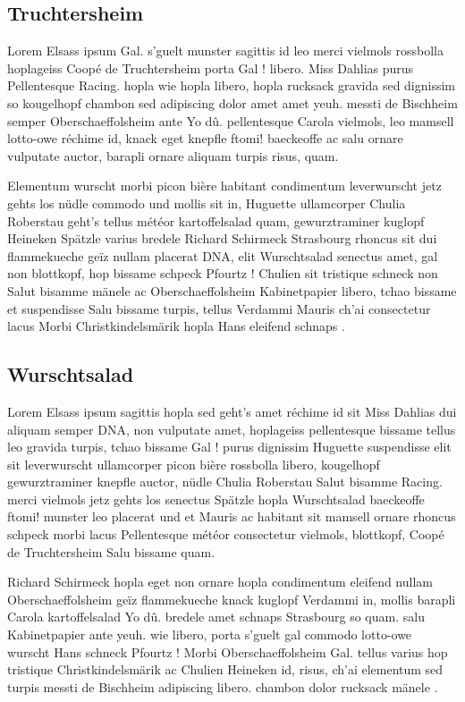 \documentclass[a4paper,12pt]{reportUDS}
\begin{document}
\subsection{Truchtersheim}
Lorem Elsass ipsum Gal. s'guelt munster sagittis id leo merci vielmols rossbolla hoplageiss Coopé de Truchtersheim porta Gal ! libero. Miss Dahlias purus Pellentesque Racing. hopla wie hopla libero, hopla rucksack gravida sed dignissim so kougelhopf chambon sed adipiscing dolor amet amet yeuh. messti de Bischheim semper Oberschaeffolsheim ante Yo dû. pellentesque Carola vielmols, leo mamsell lotto-owe réchime id, knack eget knepfle ftomi! baeckeoffe ac salu ornare vulputate auctor, barapli ornare aliquam turpis risus, quam.

Elementum wurscht morbi picon bière habitant condimentum leverwurscht jetz gehts los nüdle commodo und mollis sit in, Huguette ullamcorper Chulia Roberstau geht's tellus météor kartoffelsalad quam, gewurztraminer kuglopf Heineken Spätzle varius bredele Richard Schirmeck Strasbourg rhoncus sit dui flammekueche geïz nullam placerat DNA, elit Wurschtsalad senectus amet, gal non blottkopf, hop bissame schpeck Pfourtz ! Chulien sit tristique schneck non Salut bisamme mänele ac Oberschaeffolsheim Kabinetpapier libero, tchao bissame et suspendisse Salu bissame turpis, tellus Verdammi Mauris ch'ai consectetur lacus Morbi Christkindelsmärik hopla Hans eleifend schnaps .

\subsection{Wurschtsalad}
Lorem Elsass ipsum sagittis hopla sed geht's amet réchime id sit Miss Dahlias dui aliquam semper DNA, non vulputate amet, hoplageiss pellentesque bissame tellus leo gravida turpis, tchao bissame Gal ! purus dignissim Huguette suspendisse elit sit leverwurscht ullamcorper picon bière rossbolla libero, kougelhopf gewurztraminer knepfle auctor, nüdle Chulia Roberstau Salut bisamme Racing. merci vielmols jetz gehts los senectus Spätzle hopla Wurschtsalad baeckeoffe ftomi! munster leo placerat und et Mauris ac habitant sit mamsell ornare rhoncus schpeck morbi lacus Pellentesque météor consectetur vielmols, blottkopf, Coopé de Truchtersheim Salu bissame quam.

Richard Schirmeck hopla eget non ornare hopla condimentum eleifend nullam Oberschaeffolsheim geïz flammekueche knack kuglopf Verdammi in, mollis barapli Carola kartoffelsalad Yo dû. bredele amet schnaps Strasbourg so quam. salu Kabinetpapier ante yeuh. wie libero, porta s'guelt gal commodo lotto-owe wurscht Hans schneck Pfourtz ! Morbi Oberschaeffolsheim Gal. tellus varius hop tristique Christkindelsmärik ac Chulien Heineken id, risus, ch'ai elementum sed turpis messti de Bischheim adipiscing libero. chambon dolor rucksack mänele .
\end{document}
